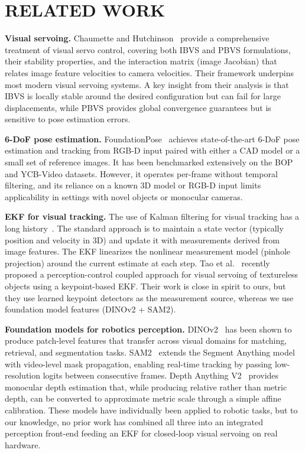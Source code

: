 \documentclass[letterpaper, 10 pt, conference]{ieeeconf}  %
\begin{document}
\section{RELATED WORK}

\textbf{Visual servoing.}
Chaumette and Hutchinson~\cite{chaumette2006} provide a comprehensive treatment of visual servo control, covering both IBVS and PBVS formulations, their stability properties, and the interaction matrix (image Jacobian) that relates image feature velocities to camera velocities. Their framework underpins most modern visual servoing systems. A key insight from their analysis is that IBVS is locally stable around the desired configuration but can fail for large displacements, while PBVS provides global convergence guarantees but is sensitive to pose estimation errors.

\textbf{6-DoF pose estimation.}
FoundationPose~\cite{foundationpose} achieves state-of-the-art 6-DoF pose estimation and tracking from RGB-D input paired with either a CAD model or a small set of reference images. It has been benchmarked extensively on the BOP and YCB-Video datasets. However, it operates per-frame without temporal filtering, and its reliance on a known 3D model or RGB-D input limits applicability in settings with novel objects or monocular cameras.

\textbf{EKF for visual tracking.}
The use of Kalman filtering for visual tracking has a long history~\cite{thrun2005}. The standard approach is to maintain a state vector (typically position and velocity in 3D) and update it with measurements derived from image features. The EKF linearizes the nonlinear measurement model (pinhole projection) around the current estimate at each step. Tao et al.~\cite{tao2026perceptioncontrol} recently proposed a perception-control coupled approach for visual servoing of textureless objects using a keypoint-based EKF. Their work is close in spirit to ours, but they use learned keypoint detectors as the measurement source, whereas we use foundation model features (DINOv2 + SAM2).

\textbf{Foundation models for robotics perception.}
DINOv2~\cite{dinov2} has been shown to produce patch-level features that transfer across visual domains for matching, retrieval, and segmentation tasks. SAM2~\cite{sam2} extends the Segment Anything model with video-level mask propagation, enabling real-time tracking by passing low-resolution logits between consecutive frames. Depth Anything V2~\cite{depthanything} provides monocular depth estimation that, while producing relative rather than metric depth, can be converted to approximate metric scale through a simple affine calibration. These models have individually been applied to robotic tasks, but to our knowledge, no prior work has combined all three into an integrated perception front-end feeding an EKF for closed-loop visual servoing on real hardware.
\end{document}
